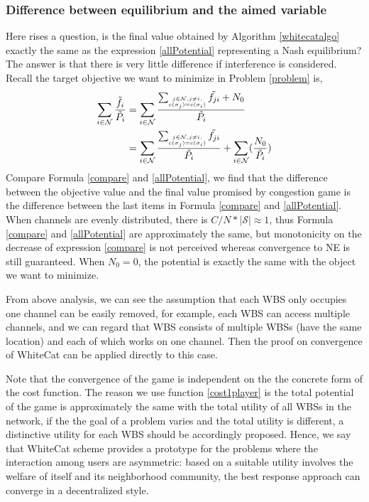 \subsubsection*{Difference between equilibrium and the aimed variable}
Here rises a question, is the final value obtained by Algorithm \ref{whitecatalgo} exactly the same as the expression \ref{allPotential} representing a Nash equilibrium? The answer is that there is very little difference if interference is considered.
Recall the target objective we want to minimize in Problem \ref{problem} is,
\begin{equation}
\label{compare}
\begin{split}	
\sum_{i\in \mathcal{N}}\dfrac{\tilde{f_i}}{\tilde{P_i}}
& = \sum\limits_{i\in \mathcal{N}}\dfrac{\sum_{\tiny\substack{j\in \mathcal{N}, j\ne i,\\ c(\sigma_j)=c(\sigma_i)}}\tilde{f_{ji}}+N_0}{\tilde{P_i}}\\
& = \sum\limits_{i\in \mathcal{N}}\dfrac{\sum_{\tiny\substack{j\in \mathcal{N}, j\ne i,\\ c(\sigma_j)=c(\sigma_i)}}\tilde{f_{ji}}}{\tilde{P_i}} + \sum\limits_{i\in \mathcal{N}}  (\dfrac{N_0}{\tilde{P_i}})\\
\end{split}
\end{equation}
Compare Formula \ref{compare} and \ref{allPotential}, we find that the difference between the objective value and the final value promised by congestion game is the difference between the last items in Formula \ref{compare} and \ref{allPotential}. When channels are evenly distributed, there is $C/N*\mid \mathcal{S}\mid\approx 1$, thus Formula \ref{compare} and \ref{allPotential} are approximately the same, but monotonicity on the decrease of expression \ref{compare} is not perceived whereas convergence to NE is still guaranteed. When $N_0=0$, the potential is exactly the same with the object we want to minimize.

From above analysis, we can see the assumption that each WBS only occupies one channel can be easily removed, for example, each WBS can access multiple channels, and we can regard that WBS consists of multiple WBSs (have the same location) and each of which works on one channel. Then the proof on convergence of WhiteCat can be applied directly to this case.

Note that the convergence of the game is independent on the the concrete form of the cost function. The reason we use function \ref{cost1player} is the total potential of the game is approximately the same with the total utility of all WBSs in the network, if the the goal of a problem varies and the total utility is different, a distinctive utility for each WBS should be accordingly proposed. Hence, we say that WhiteCat scheme provides a prototype for the problems where the interaction among users are asymmetric: based on a suitable utility involves the welfare of itself and its neighborhood community, the best response approach can converge in a decentralized style.


